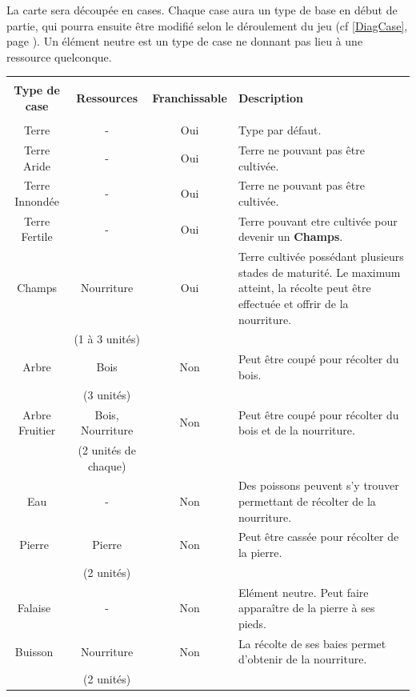 \documentclass[a4paper]{article}
\begin{document}
      La carte sera découpée en cases. Chaque case aura un type de base en début de partie, qui pourra ensuite être modifié selon le déroulement du jeu (cf \ref{DiagCase}, page \pageref{DiagCase}). Un élément neutre est un type de case ne donnant pas lieu à une ressource quelconque.\\
      \newline
      \label{TabCase}
      \begin{small}
        \begin{tabular}{| c | c | c |p{5cm}|}
          \hline
          &  &  &  \\
          \textbf{Type de case} & \textbf{Ressources} & \textbf{Franchissable} & \textbf{Description}\\
          &  &  &  \\
          \hline
          Terre & - & Oui & Type par défaut.\\
          \hline
          Terre Aride & - & Oui & Terre ne pouvant pas être cultivée.\\
          \hline
          Terre Innondée & - & Oui & Terre ne pouvant pas être cultivée.\\
          \hline
          Terre Fertile & - & Oui & Terre pouvant etre cultivée pour devenir un \textbf{Champs}.\\
          \hline
          Champs & Nourriture & Oui & Terre cultivée possédant plusieurs stades de maturité. Le maximum atteint, la récolte peut être effectuée et offrir de la nourriture.\\
          & (1 à 3 unités) &  &  \\
          \hline
          Arbre & Bois & Non & Peut être coupé pour récolter du bois.\\
          & (3 unités) &  &  \\
          \hline
          Arbre Fruitier & Bois, Nourriture & Non & Peut être coupé pour récolter du bois et de la nourriture.\\
          & (2 unités de chaque) &  &  \\
          \hline
          Eau & - & Non & Des poissons peuvent s'y trouver permettant de récolter de la nourriture.\\
          \hline
          Pierre & Pierre & Non & Peut être cassée pour récolter de la pierre.\\
          & (2 unités) &  &  \\
          \hline
          Falaise & - & Non & Elément neutre. Peut faire apparaître de la pierre à ses pieds.\\
          \hline
          Buisson & Nourriture & Non & La récolte de ses baies permet d'obtenir de la nourriture.\\
          & (2 unités) &  &  \\
          \hline
        \end{tabular}
      \end{small}
    
\end{document}
